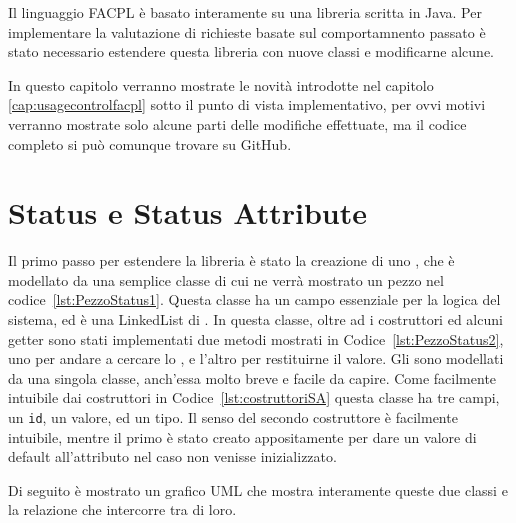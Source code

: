 \label{cap:estensione_libreria}

Il linguaggio FACPL è basato interamente su una libreria scritta in Java. 
Per implementare la valutazione di richieste basate sul comportamnento passato è stato necessario estendere questa libreria con nuove classi e modificarne alcune.\\ \par
In questo capitolo verranno mostrate le novità introdotte nel capitolo \ref{cap:usagecontrolfacpl} sotto il punto di vista implementativo, per ovvi motivi verranno mostrate solo alcune parti delle modifiche effettuate, ma il codice completo si può comunque trovare su GitHub.

\section{Status e Status Attribute} %
\label{sec:status_e_status_attribute}
Il primo passo per estendere la libreria è stato la creazione di uno \status, che è modellato da una semplice classe 
di cui ne verrà mostrato un pezzo nel codice~\ref{lst:PezzoStatus1}.
Questa classe ha un campo essenziale per la logica del sistema, ed è una LinkedList di \statusattribute.
In questa classe, oltre ad i costruttori ed alcuni getter sono stati implementati due metodi mostrati in Codice~\ref{lst:PezzoStatus2}, uno per andare a cercare lo \statusattribute, e l'altro per restituirne il valore.
Gli \statusattribute sono modellati da una singola classe, anch'essa molto breve e facile da capire.
Come facilmente intuibile dai costruttori in Codice~\ref{lst:costruttoriSA} questa classe ha tre campi, un \texttt{id}, un valore, ed un tipo. 
Il senso del secondo costruttore è facilmente intuibile, mentre il primo è stato creato appositamente per dare un valore di default all'attributo nel caso non venisse inizializzato.\\ \par
Di seguito è mostrato un grafico UML che mostra interamente queste due classi e la relazione che intercorre tra di loro.


